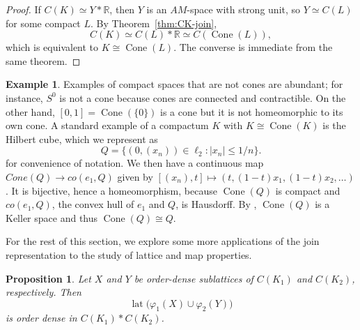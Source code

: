 \documentclass[12pt]{amsart}
\DeclareMathOperator{\lat}{lat}
\theoremstyle{plain}
\newtheorem{proposition}[theorem]{Proposition}
\theoremstyle{definition}
\newtheorem{example}[theorem]{Example}
\begin{document}
\begin{proof}
If $C(K)\simeq Y\ast \mathbb{R}$, then $Y$ is an $AM$-space with strong unit, so $Y\simeq C(L)$ for some compact $L$. By Theorem~\ref{thm:CK-join},
\[
C(K)\simeq C(L)\ast \mathbb{R}\simeq C(\operatorname{Cone}(L)),
\]
which is equivalent to $K\cong \operatorname{Cone}(L)$. The converse is immediate from the same theorem.
\end{proof}

\begin{example}
Examples of compact spaces that are not cones are abundant; for instance, $S^0$ is not a cone because cones are connected and contractible. On the other hand, $[0,1]=\operatorname{Cone}(\{0\})$ is a cone but it is not homeomorphic to its own cone. A standard example of a compactum $K$ with $K\cong \operatorname{Cone}(K)$ is the Hilbert cube, which we represent as
\[
Q=\{(0,(x_n))\in\ell_2:|x_n|\leq 1/n\}.
\]
for convenience of notation. We then have a continuous map $Cone(Q)\rightarrow co(e_1,Q)$ given by $[(x_n),t]\mapsto (t,(1-t)x_1,(1-t)x_2,\ldots)$. It is bijective, hence a homeomorphism, because $\operatorname{Cone}(Q)$ is compact and $co(e_1,Q)$, the convex hull of $e_1$ and $Q$, is Hausdorff. By \cite[Theorem 3.1, p.100]{inftop}, $\operatorname{Cone}(Q)$ is a Keller space and thus $\operatorname{Cone}(Q)\cong Q$.
\end{example} 

For the rest of this section, we explore some more applications of the join representation to the study of lattice and map properties.

\begin{proposition}\label{prop:order-dense-ck}
Let $X$ and $Y$ be order-dense sublattices of $C(K_1)$ and $C(K_2)$, respectively. Then
\[
\lat\bigl(\varphi_1(X)\cup \varphi_2(Y)\bigr)
\]
is order dense in $C(K_1)\ast C(K_2)$.
\end{proposition}
\end{document}
